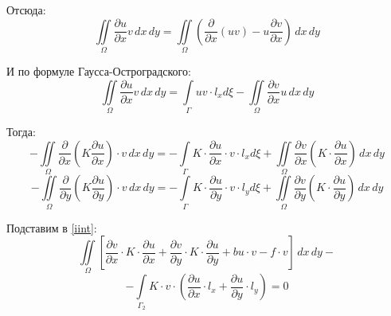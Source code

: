 	Отсюда:
	\[\iint\limits_{\Omega} \frac{\partial u}{\partial x} v \, dx \, dy = \iint\limits_{\Omega} \left( \frac{\partial}{\partial x} (uv) - u \frac{\partial v}{\partial x} \right) \, dx \, dy\]
	
	И по формуле Гаусса-Остроградского:
	\[\iint\limits_{\Omega} \frac{\partial u}{\partial x} v \, dx \, dy = \int \limits_{\Gamma} uv \cdot l_x d \xi - \iint\limits_{\Omega} \frac{\partial v}{\partial x} u \, dx \, dy\]
	
	Тогда:
	\[-\iint\limits_{\Omega} \frac{\partial}{\partial x} \left( K \frac{\partial u}{\partial x} \right) \cdot v \, dx \, dy = 
	-\int \limits_{\Gamma} K \cdot \frac{\partial u}{\partial x} \cdot v \cdot l_x d \xi + \iint\limits_{\Omega} \frac{\partial v}{\partial x} \left(  K \cdot \frac{\partial u}{\partial x} \right) \, dx \, dy\]
	\[-\iint\limits_{\Omega} \frac{\partial}{\partial y} \left( K \frac{\partial u}{\partial y} \right) \cdot v \, dx \, dy = 
	-\int \limits_{\Gamma} K \cdot \frac{\partial u}{\partial y} \cdot v \cdot l_y d \xi + \iint\limits_{\Omega} \frac{\partial v}{\partial y} \left(  K \cdot \frac{\partial u}{\partial y} \right) \, dx \, dy\]
	
	Подставим в \eqref{iint}:
	\[\iint\limits_{\Omega} \left [ \frac{\partial v}{\partial x} \cdot K \cdot \frac{\partial u}{\partial x} + \frac{\partial v}{\partial y} \cdot K \cdot \frac{\partial u}{\partial y} + bu \cdot v - f  \cdot v \right ] \, dx \, dy -\]
	\[-\int \limits_{\Gamma_2} K \cdot v \cdot \left(\frac{\partial u}{\partial x} \cdot l_x + \frac{\partial u}{\partial y} \cdot l_y \right) = 0\]

